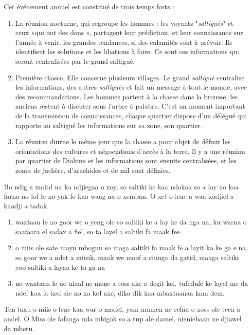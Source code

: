  \begin{paracol}{2}
   Cet événement annuel est constitué de trois temps forts :
   \begin{enumerate}
     \item La réunion nocturne, qui regroupe les hommes : les voyants "\textit{saltigués}" et ceux «qui ont des dons », partagent leur prédiction, et leur connaissance sur l'année à venir, les grandes tendances, si des calamités sont à prévoir. Ils identifient les solutions et les libations à faire. Ce sont ces informations qui seront centralisées par le grand saltigué.
     \item Première chasse. Elle concerne plusieurs villages.  Le grand \textit{saltigué} centralise les informations, des autres \textit{saltigués} et fait un message à tout le monde, avec des recommandations. Les hommes partent à la chasse dans la brousse, les anciens restent à discuter sous l'arbre à palabre. C'est un moment important de la transmission de connaissances, chaque quartier dispose d'un délégué qui rapporte au saltigué les informations sur sa zone, son quartier.
     \item La réunion diurne le même jour que la chasse a pour objet de définir les orientations des cultures et négociations d'accès à la terre. Il y a une réunion par quartier de Diohine et les informations sont ensuite centralisées, et les zones de jachère, d'arachides et de mil sont définies.
   \end{enumerate}

   \switchcolumn %
   Bo ndig a matid na ka ndjiegaa o xoy, so saltiki ke kaa ndokaa so a lay no kaa farna no fof le no yak fo kaa waag na o xemban. O xet o lene a waa xadjiel a kaadji a tadak

   \begin{enumerate}
     \item waxtaan le no goor we o yeng ole so saltiki ke a lay ke da nga na, ku warna o saafaara el sadax a fiel, so ta layel a saltiki fa maak fee.
     \item o miis ole sate mayu mbogun so maga saltiki fa maak fe a layit ka ke ga e na, so goor we a ndet a miisik, maak we moof a ciunga da gatid, maaga saltiki yoo saltiki a layaa ke ta ga na
     \item no waxtaan le no niaal ne mene a toss ake a degit kel, tufedufe ke layel me da ndef kaa fo ked ale no xa kol axe, diko dik kaa mbaxtaanaa kam dem.
   \end{enumerate}

   Ten taxu o miis o lene kaa war o madel, yam mumen ne refna o xoss ole teen a andel.
O Miss ole fafanga nda mbigok so a tup ale damel, nieniebaan ne djiawel da mbetu.

 \end{paracol}

